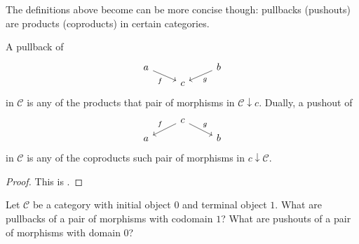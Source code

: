 The definitions above become can be more concise though: pullbacks
(pushouts) are products (coproducts) in certain categories.

\begin{proposition}
  A pullback of
  \[\begin{tikzcd}[row sep=tiny]
      a \ar["f", dr, swap] &   & b \ar["g", dl] \\
      & c &
    \end{tikzcd}\] in \(\mathcal{C}\) is any of the products that pair of
  morphisms in \(\mathcal{C} {\downarrow} c\). Dually, a pushout of
  \[\begin{tikzcd}[row sep=tiny]
      & c \ar["f", dl, swap] \ar["g", dr] & \\
      a & & b
    \end{tikzcd}\] in \(\mathcal{C}\) is any of the coproducts such pair of
  morphisms in \(c {\downarrow} \mathcal{C}\).
\end{proposition}

\begin{proof}
  This is .
\end{proof}

\begin{exercise}
  Let \(\mathcal{C}\) be a category with initial object \(0\) and terminal
  object \(1\). What are pullbacks of a pair of morphisms with codomain
  \(1\)? What are pushouts of a pair of morphisms with domain \(0\)?
\end{exercise}

